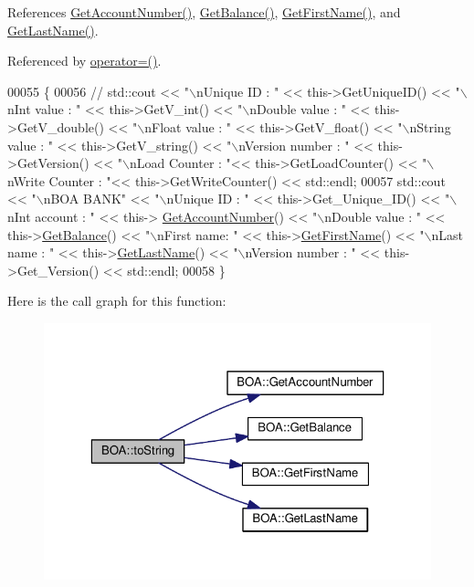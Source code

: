 References \hyperlink{_b_o_a_8cpp_source_l00080}{Get\+Account\+Number()}, \hyperlink{_b_o_a_8cpp_source_l00072}{Get\+Balance()}, \hyperlink{_b_o_a_8cpp_source_l00096}{Get\+First\+Name()}, and \hyperlink{_b_o_a_8cpp_source_l00088}{Get\+Last\+Name()}.



Referenced by \hyperlink{_b_o_a_8h_source_l00064}{operator=()}.


\begin{DoxyCode}
00055 \{
00056    \textcolor{comment}{// std::cout << "\(\backslash\)nUnique ID : " << this->GetUniqueID() << "\(\backslash\)nInt value : " << this->GetV\_int() <<
       "\(\backslash\)nDouble value : " << this->GetV\_double() << "\(\backslash\)nFloat value : " << this->GetV\_float() << "\(\backslash\)nString value : " <<
       this->GetV\_string()  << "\(\backslash\)nVersion number : " << this->GetVersion() << "\(\backslash\)nLoad Counter : "<<
       this->GetLoadCounter() << "\(\backslash\)nWrite Counter : "<< this->GetWriteCounter() << std::endl;}
00057      std::cout << \textcolor{stringliteral}{"\(\backslash\)nBOA BANK"} << \textcolor{stringliteral}{"\(\backslash\)nUnique ID : "} << this->Get\_Unique\_ID() << \textcolor{stringliteral}{"\(\backslash\)nInt account : "} << this->
      \hyperlink{class_b_o_a_ad64bd63675f8902153aa6767994f05dc}{GetAccountNumber}() << \textcolor{stringliteral}{"\(\backslash\)nDouble value : "} << this->\hyperlink{class_b_o_a_a07e30b7e5f5f20392b94af7344fd550c}{GetBalance}() << \textcolor{stringliteral}{"\(\backslash\)nFirst name:
       "} << this->\hyperlink{class_b_o_a_ae6bb3df4e1fb210610325ffd1985c7c0}{GetFirstName}() << \textcolor{stringliteral}{"\(\backslash\)nLast name : "} << this->\hyperlink{class_b_o_a_a081383edefc1f66b80c3fb8862ab070b}{GetLastName}()  << \textcolor{stringliteral}{"\(\backslash\)nVersion
       number : "} << this->Get\_Version() << std::endl;
00058 \}
\end{DoxyCode}


Here is the call graph for this function\+:\nopagebreak
\begin{figure}[H]
\begin{center}
\leavevmode
\includegraphics[width=323pt]{class_b_o_a_a348df0299997f81bcad0ec034dab0b8d_cgraph}
\end{center}
\end{figure}





